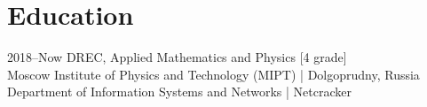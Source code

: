 \documentclass[]{cv-style}          %
\begin{document}
\begin{entrylist}
%
%
%
%

\end{entrylist}


\section{Education}

\begin{entrylist}
\entry
{2018--Now}
{{\normalfont DREC, Applied Mathematics and Physics [4 grade]}}
{\\ Moscow Institute of Physics and Technology (MIPT)  |  Dolgoprudny, Russia \\Department of Information Systems and Networks | Netcracker}
{\vspace{-0.3cm}}
\end{entrylist}
\end{document}
